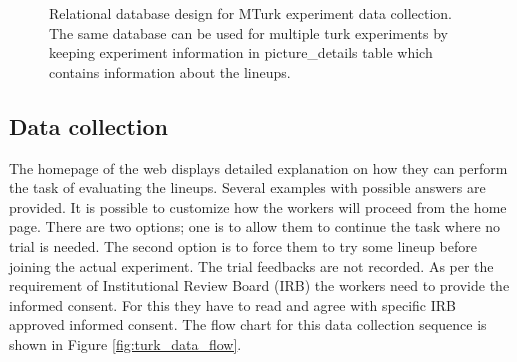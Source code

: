 \documentclass[11pt]{article}
\begin{document}
\begin{figure}[hbtp]
   \centering
       \caption{Relational database design for MTurk experiment data collection. The same database can be used for multiple turk experiments by keeping experiment information in picture\_details table which contains information about the lineups.}
       \label{fig:turk_database_design}
\end{figure}

\subsection{Data collection} 

The homepage of the web displays detailed explanation on how they can perform the task of evaluating the lineups. Several examples with possible answers are provided. It is possible to customize how the workers will proceed from the home page. There are two options; one is to allow them to continue the task where no trial is needed. The second option is to force them to try some lineup before joining the actual experiment. The trial feedbacks are not recorded. As per the requirement of Institutional Review Board (IRB) the workers need to provide the informed consent. For this they have to read and agree with specific IRB approved informed consent. The flow chart for this data collection sequence is shown in Figure \ref{fig:turk_data_flow}.
\end{document}
